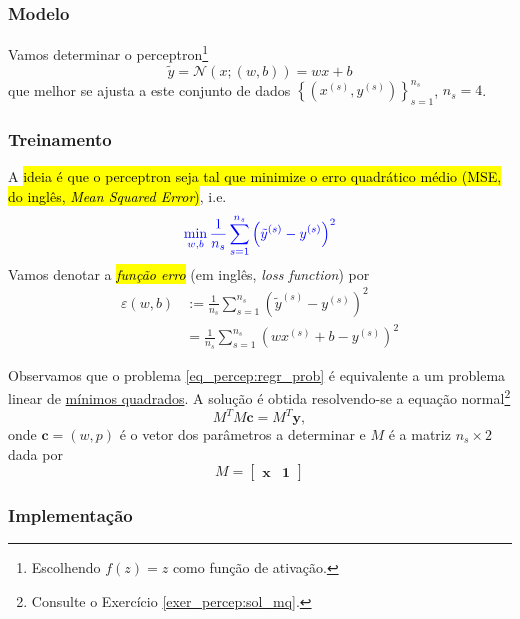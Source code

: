 \subsubsection{Modelo}

Vamos determinar o perceptron\footnote{Escolhendo $f(z)=z$ como função de ativação.}
\begin{equation}\label{eq:percep_regr}
  \tilde{y} = \mathcal{N}(x; (w, b)) = wx + b
\end{equation}
que melhor se ajusta a este conjunto de dados $\left\{(x^{(s)}, y^{(s)})\right\}_{s=1}^{n_s}$, $n_s=4$.

\subsubsection{Treinamento}

A \hl{ideia é que o perceptron seja tal que minimize o erro quadrático médio (MSE, do inglês, \textit{Mean Squared Error})}, i.e.
\begin{equation}\label{eq_percep:regr_prob}\color{blue}\min_{w,b}\frac{1}{n_s}\sum_{s=1}^{n_s}\left(\tilde{y}^{(s)}-y^{(s)}\right)^2
\end{equation}
Vamos denotar a \hl{\emph{função erro}} (em inglês, \textit{loss function}) por
\begin{align}\label{eq:eqm}
  \varepsilon(w,b) &:= \frac{1}{n_s}\sum_{s=1}^{n_s}\left(\tilde{y}^{(s)}-y^{(s)}\right)^2\\
                   &= \frac{1}{n_s}\sum_{s=1}^{n_s}\left(wx^{(s)}+b-y^{(s)}\right)^2
\end{align}

Observamos que o problema \eqref{eq_percep:regr_prob} é equivalente a um problema linear de \href{https://notaspedrok.com.br/notas/MatematicaNumerica/cap_ajuste_sec_prob_lin.html}{mínimos quadrados}. A solução é obtida resolvendo-se a equação normal\footnote{Consulte o Exercício \ref{exer_percep:sol_mq}.}
\begin{equation}\label{eq_percep:sol_mq}
  M^TM\pmb{c} = M^T\pmb{y},
\end{equation}
onde $\pmb{c} = (w, p)$ é o vetor dos parâmetros a determinar e $M$ é a matriz $n_s\times 2$ dada por
\begin{equation}
  M =
  \begin{bmatrix}
    \pmb{x} & \pmb{1}
  \end{bmatrix}
\end{equation}

\subsubsection{Implementação}

